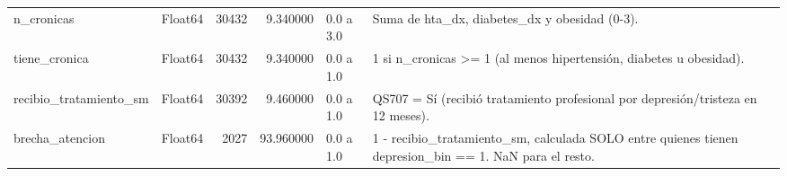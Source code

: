 \begin{longtable}{llrrll}
n\_cronicas & Float64 & 30432 & 9.340000 & 0.0 a 3.0 & Suma de hta\_dx, diabetes\_dx y obesidad (0-3). \\
tiene\_cronica & Float64 & 30432 & 9.340000 & 0.0 a 1.0 & 1 si n\_cronicas >= 1 (al menos hipertensión, diabetes u obesidad). \\
recibio\_tratamiento\_sm & Float64 & 30392 & 9.460000 & 0.0 a 1.0 & QS707 = Sí (recibió tratamiento profesional por depresión/tristeza en 12 meses). \\
brecha\_atencion & Float64 & 2027 & 93.960000 & 0.0 a 1.0 & 1 - recibio\_tratamiento\_sm, calculada SOLO entre quienes tienen depresion\_bin == 1. NaN para el resto. \\
\end{longtable}
